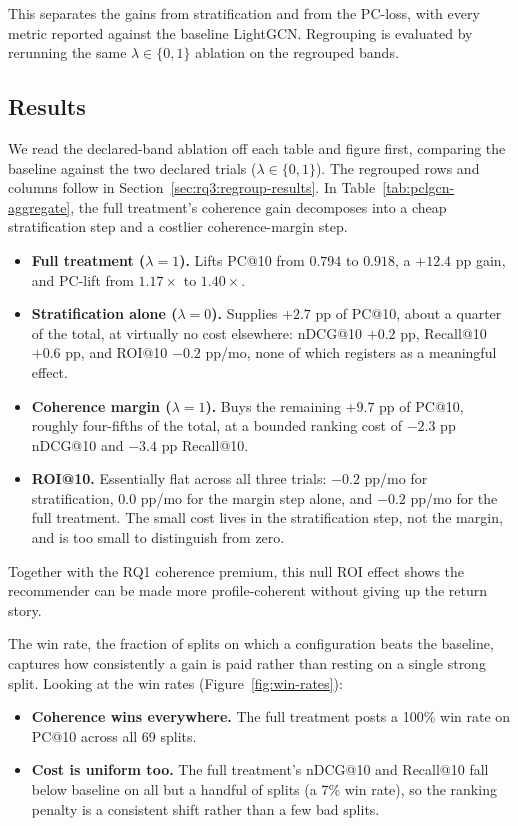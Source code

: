 This separates the gains from stratification and from the PC-loss, with every metric reported against the baseline LightGCN. Regrouping is evaluated by rerunning the same $\lambda \in \{0, 1\}$ ablation on the regrouped bands.

\subsection{Results}
\label{sec:rq3:results}

We read the declared-band ablation off each table and figure first, comparing the baseline against the two declared trials ($\lambda \in \{0, 1\}$). The regrouped rows and columns follow in Section~\ref{sec:rq3:regroup-results}. In Table~\ref{tab:pclgcn-aggregate}, the full treatment's coherence gain decomposes into a cheap stratification step and a costlier coherence-margin step.
\begin{itemize}
    \item \textbf{Full treatment ($\lambda = 1$).} Lifts PC@10 from $0.794$ to $0.918$, a $+12.4$ pp gain, and PC-lift from $1.17\times$ to $1.40\times$.
    \item \textbf{Stratification alone ($\lambda = 0$).} Supplies $+2.7$ pp of PC@10, about a quarter of the total, at virtually no cost elsewhere: nDCG@10 $+0.2$ pp, Recall@10 $+0.6$ pp, and ROI@10 $-0.2$ pp/mo, none of which registers as a meaningful effect.
    \item \textbf{Coherence margin ($\lambda = 1$).} Buys the remaining $+9.7$ pp of PC@10, roughly four-fifths of the total, at a bounded ranking cost of $-2.3$ pp nDCG@10 and $-3.4$ pp Recall@10.
    \item \textbf{ROI@10.} Essentially flat across all three trials: $-0.2$ pp/mo for stratification, $0.0$ pp/mo for the margin step alone, and $-0.2$ pp/mo for the full treatment. The small cost lives in the stratification step, not the margin, and is too small to distinguish from zero.
\end{itemize}
Together with the RQ1 coherence premium, this null ROI effect shows the recommender can be made more profile-coherent without giving up the return story.

The win rate, the fraction of splits on which a configuration beats the baseline, captures how consistently a gain is paid rather than resting on a single strong split. Looking at the win rates (Figure~\ref{fig:win-rates}):
\begin{itemize}
    \item \textbf{Coherence wins everywhere.} The full treatment posts a 100\% win rate on PC@10 across all 69 splits.
    \item \textbf{Cost is uniform too.} The full treatment's nDCG@10 and Recall@10 fall below baseline on all but a handful of splits (a 7\% win rate), so the ranking penalty is a consistent shift rather than a few bad splits.
\end{itemize}

